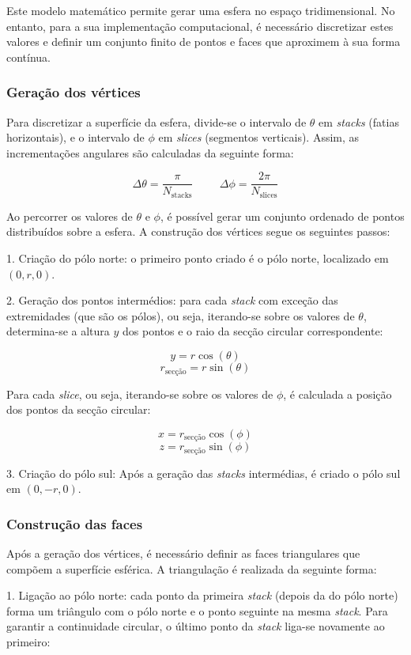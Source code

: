 \documentclass[12pt, a4paper]{article}
\begin{document}
Este modelo matemático permite gerar uma esfera no espaço tridimensional. No entanto, para a sua
implementação computacional, é necessário discretizar estes valores e definir um conjunto finito de
pontos e faces que aproximem à sua forma contínua.

\subsubsection{Geração dos vértices}

Para discretizar a superfície da esfera, divide-se o intervalo de $\theta$ em \emph{stacks} (fatias
horizontais), e o intervalo de $\phi$ em \emph{slices} (segmentos verticais). Assim, as
incrementações angulares são calculadas da seguinte forma:

$$
\Delta\theta = \frac{\pi}{N_\text{stacks}}
\hspace{1cm}
\Delta\phi = \frac{2\pi}{N_\text{slices}}
$$

Ao percorrer os valores de $\theta$ e $\phi$, é possível gerar um conjunto ordenado de pontos
distribuídos sobre a esfera. A construção dos vértices segue os seguintes passos:

1. Criação do pólo norte: o primeiro ponto criado é o pólo norte, localizado em $(0, r, 0)$.

2. Geração dos pontos intermédios: para cada \emph{stack} com exceção das extremidades (que são os
pólos), ou seja, iterando-se sobre os valores de $\theta$, determina-se a altura $y$ dos pontos e o
raio da secção circular correspondente:

$$y = r \cos(\theta)$$
$$r_{\text{secção}} = r \sin(\theta)$$

Para cada \emph{slice}, ou seja, iterando-se sobre os valores de $\phi$, é calculada a posição dos
pontos da secção circular:

$$x = r_{\text{secção}} \cos(\phi)$$
$$z = r_{\text{secção}} \sin(\phi)$$


3. Criação do pólo sul: Após a geração das \emph{stacks} intermédias, é criado o pólo sul em
$(0, -r, 0)$.

\subsubsection{Construção das faces}

Após a geração dos vértices, é necessário definir as faces triangulares que compõem a superfície
esférica. A triangulação é realizada da seguinte forma:

1. Ligação ao pólo norte: cada ponto da primeira \emph{stack} (depois da do pólo norte) forma um
triângulo com o pólo norte e o ponto seguinte na mesma \emph{stack}. Para garantir a continuidade
circular, o último ponto da \emph{stack} liga-se novamente ao primeiro:
\end{document}
